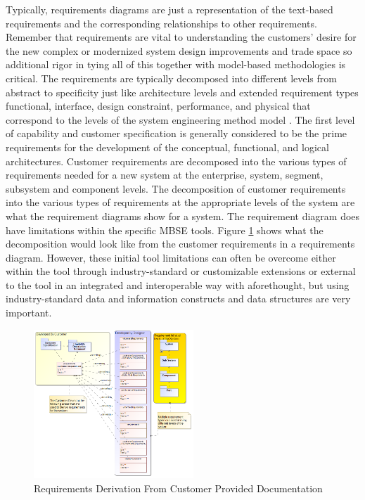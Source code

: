 \documentclass[num-refs]{wiley-article}
\begin{document}
Typically, requirements diagrams are just a representation of the text-based requirements and the corresponding relationships to other requirements. Remember that requirements are vital to understanding the customers' desire for the new complex or modernized system design improvements and trade space so additional rigor in tying all of this together with model-based methodologies is critical. The requirements are typically decomposed into different levels from abstract to specificity just like architecture levels and extended requirement types functional, interface, design constraint, performance, and physical that correspond to the levels of the system engineering method model \cite{Kossiakoff2011}. The first level of capability and customer specification is generally considered to be the prime requirements for the development of the conceptual, functional, and logical architectures. Customer requirements are decomposed into the various types of requirements needed for a new system at the enterprise, system, segment, subsystem and component levels. The decomposition of customer requirements into the various types of requirements at the appropriate levels of the system are what the requirement diagrams show for a system. The requirement diagram does have limitations within the specific MBSE tools. Figure \ref{fig4} shows what the decomposition would look like from the customer requirements in a requirements diagram. However, these initial tool limitations can often be overcome either within the tool through industry-standard or customizable extensions or external to the tool in an integrated and interoperable way with aforethought, but using industry-standard data and information constructs and data structures are very important.

\begin{figure}
\centering
\includegraphics[width=6cm]{Images/Capture4.png}
\caption{Requirements Derivation From Customer Provided Documentation}
\label{fig4}
\end{figure}
\end{document}
